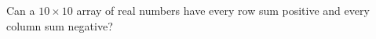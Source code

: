 Can a $10\times10$ array of real numbers have every row sum positive and every column sum negative?
